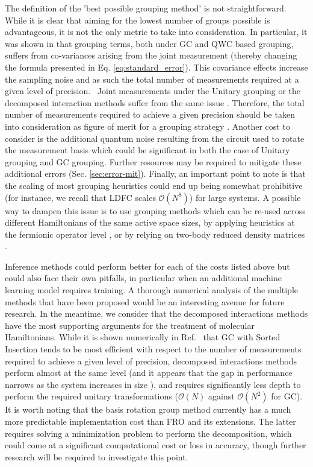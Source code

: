 The definition of the 'best possible grouping method' is not straightforward. While it is clear that aiming for the lowest number of groups possible is advantageous, it is not the only metric to take into consideration. In particular, it was shown in \cite{mccleanTheoryVariationalHybrid2015} that grouping terms, both under GC and QWC based grouping, suffers from co-variances arising from the joint measurement (thereby changing the formula presented in Eq. \ref{eq:standard_error}). This covariance effects increase the sampling noise and as such the total number of measurements required at a given level of precision. ~Joint measurements under the Unitary grouping or the decomposed interaction methods suffer from the same issue \cite{Yen2021_Cartan}. Therefore, the total number of measurements required to achieve a given precision should be taken into consideration as figure of merit for a grouping strategy \cite{Crawford2021}. Another cost to consider is the additional quantum noise resulting from the circuit used to rotate the measurement basis which could be significant in both the case of Unitary grouping and GC grouping. Further resources may be required to mitigate these additional errors (Sec. \ref{sec:error-mit}). Finally, an important point to note is that the scaling of most grouping heuristics could end up being somewhat prohibitive (for instance, we recall that LDFC scales $\mathcal{O}(N^8)$) for large systems. A possible way to dampen this issue is to use grouping methods which can be re-used across different Hamiltonians of the same active space sizes, by applying heuristics at the fermionic operator level \cite{Gokhale2019_long}, or by relying on two-body reduced density matrices \cite{Tilly2021}. 

Inference methods could perform better for each of the costs listed above but could also face their own pitfalls, in particular when an additional machine learning model requires training. A thorough numerical analysis of the multiple methods that have been proposed would be an interesting avenue for future research. In the meantime, we consider that the decomposed interactions \cite{Huggins2021, Yen2021_Cartan} methods have the most supporting arguments for the treatment of molecular Hamiltonians. While it is shown numerically in Ref.~\cite{Yen2021_Cartan} that GC with Sorted Insertion \cite{Crawford2021} tends to be most efficient with respect to the number of measurements required to achieve a given level of precision, decomposed interactions methods perform almost at the same level (and it appears that the gap in performance narrows as the system increases in size \cite{Yen2021_Cartan}), and requires significantly less depth to perform the required unitary transformations ($\mathcal{O}(N)$ against $\mathcal{O}(N^2)$ for GC). It is worth noting that the basis rotation group method \cite{Huggins2021} currently has a much more predictable implementation cost than FRO and its extensions. The latter requires solving a minimization problem to perform the decomposition, which could come at a significant computational cost or loss in accuracy, though further research will be required to investigate this point. 
